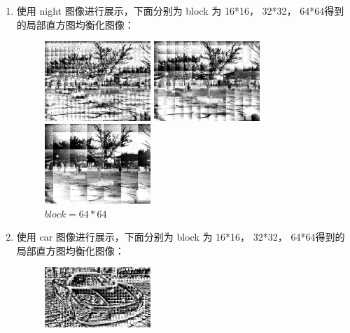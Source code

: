 \documentclass[a4paper,UTF8]{article}
\numberwithin{equation}{section}
\begin{document}
\begin{enumerate}
\begin{figure}[H]
\begin{minipage}[t]{0.30\textwidth}
\label{Lenna:64_local}
\end{minipage}
\end{figure}
\item 使用 night 图像进行展示，下面分别为 block 为 16*16， 32*32， 64*64得到的局部直方图均衡化图像：
\begin{figure}[H]
\centering
\begin{minipage}[t]{0.30\textwidth}
\centering
\includegraphics[width=4cm]{night_local_16.png}
\caption{$block = 16*16$}
\label{night:16_local}
\end{minipage}
\centering
\begin{minipage}[t]{0.30\textwidth}
\centering
\includegraphics[width=4cm]{night_local_32.png}
\caption{$block = 32*32$}
\label{night:32_local}
\end{minipage}
\centering
\begin{minipage}[t]{0.30\textwidth}
\centering
\includegraphics[width=4cm]{night_local_64.png}
\caption{$block = 64*64$}
\label{night:64_local}
\end{minipage}
\end{figure}
\item 使用 car 图像进行展示，下面分别为 block 为 16*16， 32*32， 64*64得到的局部直方图均衡化图像：
\begin{figure}[H]
\centering
\begin{minipage}[t]{0.30\textwidth}
\centering
\includegraphics[width=4cm]{car_local_16.png}

\end{minipage}
\end{figure}
\end{enumerate}
\end{document}
